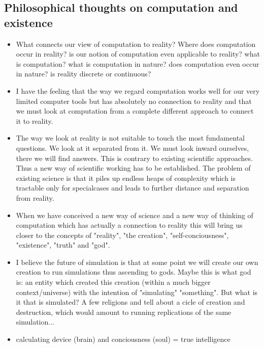 \documentclass{article}
\begin{document}
\subsection{Philosophical thoughts on computation and existence}
\begin{itemize}
\item What connects our view of computation to reality? Where does computation occur in reality? is our notion of computation even applicable to reality? what is computation? what is computation in nature? does computation even occur in nature? is reality discrete or continuous?
\item I have the feeling that the way we regard computation works well for our very limited computer tools but has absolutely no connection to reality and that we must look at computation from a complete different approach to connect it to reality.
\item The way we look at reality is not suitable to touch the most fundamental questions. We look at it separated from it. We must look inward ourselves, there we will find answers. This is contrary to existing scientific approaches. Thus a new way of scientific working has to be established. The problem of existing science is that it piles up endless heaps of complexity which is tractable only for specialcases and leads to further distance and separation from reality.
\item When we have conceived a new way of science and a new way of thinking of computation which has actually a connection to reality this will bring us closer to the concepts of "reality", "the creation", "self-conciousness", "existence", "truth" and "god".
\item I believe the future of simulation is that at some point we will create our own creation to run simulations thus ascending to gods. Maybe this is what god is: an entity which created this creation (within a much bigger context/universe) with the intention of "simulating" "something". But what is it that is simulated? A few religions and tell about a cicle of creation and destruction, which would amount to running replications of the same simulation... 
\item calculating device (brain) and conciousness (soul) = true intelligence
\end{itemize}
\end{document}
